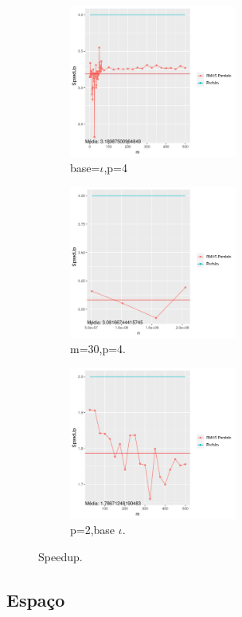 \documentclass[11pt]{article}
\begin{document}
\begin{center}
\begin{figure}
\begin{subfigure}[b]{.33\linewidth}
\centering
\includegraphics[width=5.5cm]{mxspeedup}
\caption{base=$\iota$,p=4}\label{fig:mxspeedup}
\end{subfigure}
\begin{subfigure}[b]{.33\linewidth}
\centering
\includegraphics[width=5.5cm]{nxspeedup}
\caption{m=30,p=4.}\label{fig:nxspeedup}
\end{subfigure}
\begin{subfigure}[b]{.33\linewidth}
\centering
\caption{p=2,base $\iota$.}\label{fig:mxspeedup2p}
\includegraphics[width=5.5cm]{mxspeedup2p}
\end{subfigure}
\caption{Speedup.}
\end{figure}
\end{center}

\subsection{Espaço}
\label{sec:org2ea6658}
\end{document}
